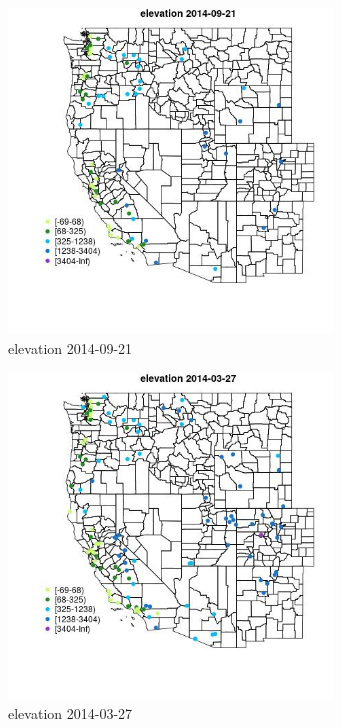 \begin{figure} 
\centering  
\includegraphics[width=0.77\textwidth]{Code_Outputs/Report_ML_input_PM25_Step4_part_e_de_duplicated_aveswNAs_MapObselevation2014-09-21.jpg} 
\caption{\label{fig:Report_ML_input_PM25_Step4_part_e_de_duplicated_aveswNAsMapObselevation2014-09-21}elevation 2014-09-21} 
\end{figure} 
 

\begin{figure} 
\centering  
\includegraphics[width=0.77\textwidth]{Code_Outputs/Report_ML_input_PM25_Step4_part_e_de_duplicated_aveswNAs_MapObselevation2014-03-27.jpg} 
\caption{\label{fig:Report_ML_input_PM25_Step4_part_e_de_duplicated_aveswNAsMapObselevation2014-03-27}elevation 2014-03-27} 
\end{figure} 
 

